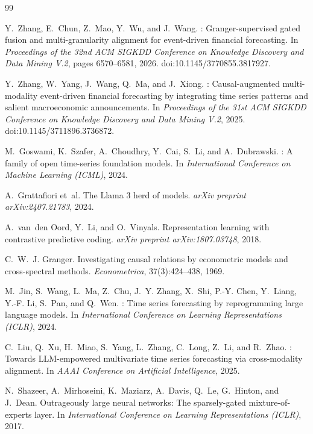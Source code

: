\documentclass{article}
\begin{document}
\small
\begin{thebibliography}{99}

Y.~Zhang, E.~Chun, Z.~Mao, Y.~Wu, and J.~Wang.
: Granger-supervised gated fusion and multi-granularity alignment for event-driven financial forecasting.
\newblock In \emph{Proceedings of the 32nd ACM SIGKDD Conference on Knowledge Discovery and Data Mining V.2}, pages 6570--6581, 2026. doi:10.1145/3770855.3817927.

Y.~Zhang, W.~Yang, J.~Wang, Q.~Ma, and J.~Xiong.
: Causal-augmented multi-modality event-driven financial forecasting by integrating time series patterns and salient macroeconomic announcements.
\newblock In \emph{Proceedings of the 31st ACM SIGKDD Conference on Knowledge Discovery and Data Mining V.2}, 2025. doi:10.1145/3711896.3736872.

M.~Goswami, K.~Szafer, A.~Choudhry, Y.~Cai, S.~Li, and A.~Dubrawski.
: A family of open time-series foundation models.
\newblock In \emph{International Conference on Machine Learning (ICML)}, 2024.

A.~Grattafiori et~al.
\newblock The {Llama} 3 herd of models.
\newblock \emph{arXiv preprint arXiv:2407.21783}, 2024.

A.~van~den Oord, Y.~Li, and O.~Vinyals.
\newblock Representation learning with contrastive predictive coding.
\newblock \emph{arXiv preprint arXiv:1807.03748}, 2018.

C.~W.~J. Granger.
\newblock Investigating causal relations by econometric models and cross-spectral methods.
\newblock \emph{Econometrica}, 37(3):424--438, 1969.

M.~Jin, S.~Wang, L.~Ma, Z.~Chu, J.~Y. Zhang, X.~Shi, P.-Y. Chen, Y.~Liang, Y.-F. Li, S.~Pan, and Q.~Wen.
: Time series forecasting by reprogramming large language models.
\newblock In \emph{International Conference on Learning Representations (ICLR)}, 2024.

C.~Liu, Q.~Xu, H.~Miao, S.~Yang, L.~Zhang, C.~Long, Z.~Li, and R.~Zhao.
: Towards {LLM}-empowered multivariate time series forecasting via cross-modality alignment.
\newblock In \emph{AAAI Conference on Artificial Intelligence}, 2025.

N.~Shazeer, A.~Mirhoseini, K.~Maziarz, A.~Davis, Q.~Le, G.~Hinton, and J.~Dean.
\newblock Outrageously large neural networks: The sparsely-gated mixture-of-experts layer.
\newblock In \emph{International Conference on Learning Representations (ICLR)}, 2017.


\end{thebibliography}
\end{document}
